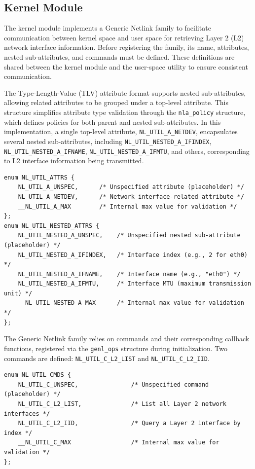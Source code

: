 \documentclass[10pt, letterpaper]{article}
\begin{document}
\subsection{Kernel Module}
The kernel module implements a Generic Netlink family to facilitate communication between
kernel space and user space for retrieving Layer 2 (L2) network interface information. Before
registering the family, its name, attributes, nested sub-attributes, and commands must be
defined. These definitions are shared between the kernel module and the user-space utility
to ensure consistent communication.

The Type-Length-Value (TLV) attribute format supports nested sub-attributes, allowing
related attributes to be grouped under a top-level attribute. This structure simplifies
attribute type validation through the \texttt{nla\_policy} structure, which defines
policies for both parent and nested sub-attributes. In this implementation, a single
top-level attribute, \texttt{NL\_UTIL\_A\_NETDEV}, encapsulates several nested
sub-attributes, including \texttt{NL\_UTIL\_NESTED\_A\_IFINDEX},
\texttt{NL\_UTIL\_NESTED\_A\_IFNAME}, \texttt{NL\_UTIL\_NESTED\_A\_IFMTU}, and others,
corresponding to L2 interface information being transmitted.

\begin{lstlisting}[caption={Top-level and nested attribute definitions}]
enum NL_UTIL_ATTRS {
    NL_UTIL_A_UNSPEC,      /* Unspecified attribute (placeholder) */
    NL_UTIL_A_NETDEV,      /* Network interface-related attribute */
    __NL_UTIL_A_MAX        /* Internal max value for validation */
};
enum NL_UTIL_NESTED_ATTRS {
    NL_UTIL_NESTED_A_UNSPEC,    /* Unspecified nested sub-attribute (placeholder) */
    NL_UTIL_NESTED_A_IFINDEX,   /* Interface index (e.g., 2 for eth0) */
    NL_UTIL_NESTED_A_IFNAME,    /* Interface name (e.g., "eth0") */
    NL_UTIL_NESTED_A_IFMTU,     /* Interface MTU (maximum transmission unit) */
    __NL_UTIL_NESTED_A_MAX      /* Internal max value for validation */
};
\end{lstlisting}

The Generic Netlink family relies on commands and their corresponding callback functions,
registered via the \texttt{genl\_ops} structure during initialization. Two commands are
defined: \texttt{NL\_UTIL\_C\_L2\_LIST} and \texttt{NL\_UTIL\_C\_L2\_IID}.

\begin{lstlisting}[caption={Commands}]
enum NL_UTIL_CMDS {
    NL_UTIL_C_UNSPEC,               /* Unspecified command (placeholder) */
    NL_UTIL_C_L2_LIST,              /* List all Layer 2 network interfaces */
    NL_UTIL_C_L2_IID,               /* Query a Layer 2 interface by index */
    __NL_UTIL_C_MAX                 /* Internal max value for validation */
};
\end{lstlisting}
\end{document}
